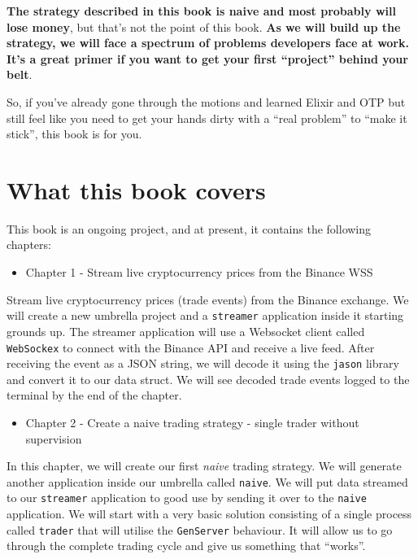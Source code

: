 \documentclass[
  oneside]{book}
\providecommand{\tightlist}{%
  \setlength{\itemsep}{0pt}\setlength{\parskip}{0pt}}
\begin{document}
\textbf{The strategy described in this book is naive and most probably will lose money}, but that's not the point of this book. \textbf{As we will build up the strategy, we will face a spectrum of problems developers face at work. It's a great primer if you want to get your first ``project'' behind your belt}.

So, if you've already gone through the motions and learned Elixir and OTP but still feel like you need to get your hands dirty with a ``real problem'' to ``make it stick'', this book is for you.

\section*{What this book covers}\label{what-this-book-covers}

This book is an ongoing project, and at present, it contains the following chapters:

\begin{itemize}
\tightlist
\item
  Chapter 1 - Stream live cryptocurrency prices from the Binance WSS
\end{itemize}

Stream live cryptocurrency prices (trade events) from the Binance exchange. We will create a new umbrella project and a \texttt{streamer} application inside it starting grounds up. The streamer application will use a Websocket client called \texttt{WebSockex} to connect with the Binance API and receive a live feed. After receiving the event as a JSON string, we will decode it using the \texttt{jason} library and convert it to our data struct. We will see decoded trade events logged to the terminal by the end of the chapter.

\begin{itemize}
\tightlist
\item
  Chapter 2 - Create a naive trading strategy - single trader without supervision
\end{itemize}

In this chapter, we will create our first \emph{naive} trading strategy. We will generate another application inside our umbrella called \texttt{naive}. We will put data streamed to our \texttt{streamer} application to good use by sending it over to the \texttt{naive} application. We will start with a very basic solution consisting of a single process called \texttt{trader} that will utilise the \texttt{GenServer} behaviour. It will allow us to go through the complete trading cycle and give us something that ``works''.
\end{document}
